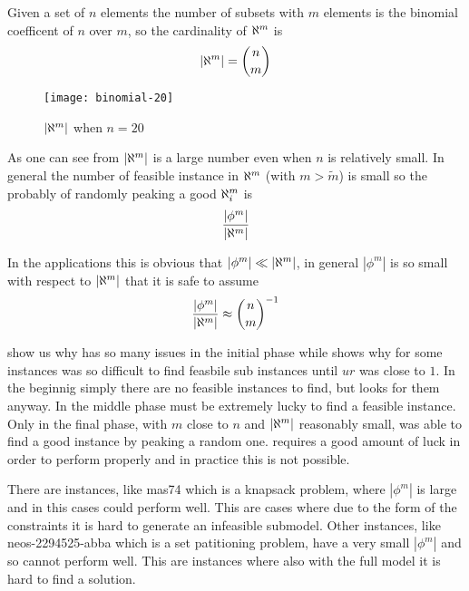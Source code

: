Given a set of $n$ elements the number of subsets with $m$ elements is the binomial coefficent
of $n$ over $m$, so the cardinality of $\aleph^{m}$ is
\begin{align}
    |\aleph^{m}| = \binom{n}{m}
\end{align}

\begin{figure}[ht]
    \centering
    \texttt{[image: binomial-20]}
    \caption{$|\aleph^{m}|$ when $n = 20$}\label{fig:plot-binom-20}
\end{figure}

As one can see from  $|\aleph^{m}|$ is a large number even when $n$ is relatively small. 
In general the number of feasible instance in $\aleph^{m}$ (with $m > \tilde{m}$) is small so the probably of 
randomly peaking a good $\aleph^{m}_{i}$ is
\begin{align}
    \frac{|\phi^{m}|}{|\aleph^{m}|}
\end{align}

In the applications this is obvious that $|\phi^{m}| \ll |\aleph^{m}|$, in general $|\phi^{m}|$ is so small with respect to $|\aleph^{m}|$
that it is safe to assume
\begin{align}
    \frac{|\phi^{m}|}{|\aleph^{m}|} \approx \binom{n}{m}^{-1} \label{eq:prob-good-instance}
\end{align}

 show us why \fk{} has so many issues in the initial phase while
 shows why for some instances was so difficult to find feasbile sub instances until $ur$ was close to $1$. 
In the beginnig simply there are no feasible instances to find, but \fk{} looks for them anyway. In the middle phase \fk{} must be 
extremely lucky to find a feasible instance. Only in the final phase, with $m$ close to $n$ and $|\aleph^{m}|$ reasonably small, \fk{} was able 
to find a good instance by peaking a random one. \fk{} requires a good amount of luck in order to perform properly and in practice 
this is not possible.

There are instances, like mas74 which is a knapsack problem, where $|\phi^{m}|$ is large and in this cases \fk{} could perform well. This are 
cases where due to the form of the constraints it is hard to generate an infeasible submodel. Other instances, like neos-2294525-abba  which is 
a set patitioning problem, have a very small $|\phi^{m}|$ and so \fk{} cannot perform well. This are instances where also with the full model
it is hard to find a solution.








